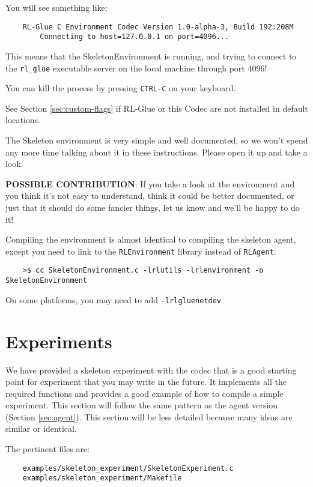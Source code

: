 \documentclass[11pt]{article}
\begin{document}
You will see something like:
\begin{verbatim}
	RL-Glue C Environment Codec Version 1.0-alpha-3, Build 192:208M
		Connecting to host=127.0.0.1 on port=4096...
\end{verbatim}

This means that the SkeletonEnvironment is running, and trying to connect to the \texttt{rl\_glue} executable server on the local machine through port $4096$! 

You can kill the process by pressing \texttt{CTRL-C} on your keyboard.

See Section \ref{sec:custom-flags} if RL-Glue or this Codec are not installed in default locations.

The Skeleton environment is very simple and well documented, so we won't spend any more time talking about it in these instructions.
Please open it up and take a look.

\textbf{POSSIBLE CONTRIBUTION}: If you take a look at the environment and you think it's not easy to understand, think it could be better documented, 
or just that it should do some fancier things, let us know and we'll be happy to do it!

Compiling the environment is almost identical to compiling the skeleton agent, except you need to link to the \texttt{RLEnvironment} library instead of \texttt{RLAgent}.
\begin{verbatim}
	>$ cc SkeletonEnvironment.c -lrlutils -lrlenvironment -o SkeletonEnvironment
\end{verbatim}

On some platforms, you may need to add \texttt{-lrlgluenetdev}

\section{Experiments}
We have provided a skeleton experiment with the codec that is a good starting point for experiment that you may write in the future.
It implements all the required functions and provides a good example of how to compile a simple experiment.  This section will follow the same 
pattern as the agent version (Section \ref{sec:agent}).  This section will be less detailed because many ideas are similar or identical.

The pertinent files are:
\begin{verbatim}
	examples/skeleton_experiment/SkeletonExperiment.c
	examples/skeleton_experiment/Makefile
\end{verbatim}
\end{document}
